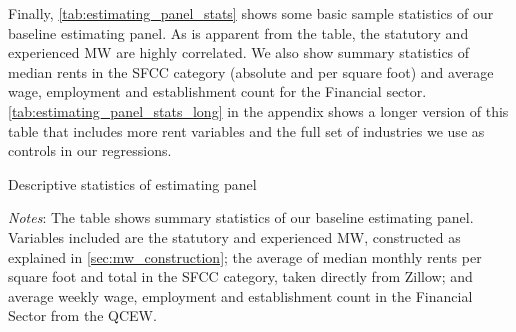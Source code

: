 Finally, \autoref{tab:estimating_panel_stats} shows some basic sample statistics of our 
baseline estimating panel. As is apparent from the table, the statutory and experienced
MW are highly correlated. We also show summary statistics of median rents in the SFCC 
category (absolute and per square foot) and average wage, employment and establishment 
count for the Financial sector. \autoref{tab:estimating_panel_stats_long} in the appendix 
shows a longer version of this table that includes more rent variables and the full set
of industries we use as controls in our regressions.

\begin{table}[h!]
	\caption{Descriptive statistics of estimating panel}
	\centering
	\label{tab:estimating_panel_stats}    
	
	\begin{minipage}{0.95\textwidth} \footnotesize
		\vspace{3mm} 
		\textit{Notes}: The table shows summary statistics of our baseline estimating panel.
		Variables included are the statutory and experienced MW, constructed as explained in
		\autoref{sec:mw_construction}; the average of median monthly rents per square foot 
		and total in the SFCC category, taken directly from Zillow; and average weekly wage, 
		employment and establishment count in the Financial Sector from the QCEW.
	\end{minipage}
\end{table}
